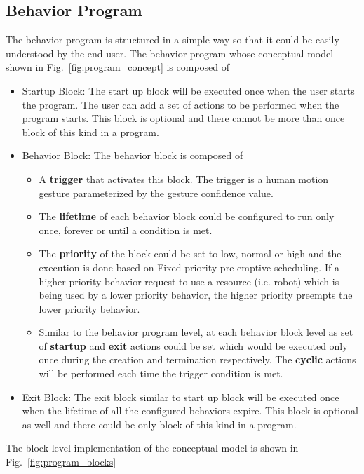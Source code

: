 \documentclass{llncs}
\begin{document}
\subsection{Behavior Program}
%
The behavior program is structured in a simple way so that it could be easily understood by the end user. The behavior program whose conceptual model shown in Fig.~\ref{fig:program_concept} is composed of
\begin{itemize}
\item Startup Block: The start up block will be executed once when the user starts the program. The user can add a set of actions to be performed when the program starts. This block is optional and there cannot be more than once block of this kind in a program.
\item Behavior Block: The behavior block is composed of
\begin{itemize}
\item A \textbf{trigger} that activates this block. The trigger is a human motion gesture parameterized by the gesture confidence value.
\item The \textbf{lifetime} of each behavior block could be configured to run only once, forever or until a condition is met. 
\item The \textbf{priority} of the block could be set to low, normal or high and the execution is done based on Fixed-priority pre-emptive scheduling. If a higher priority behavior request to use a resource (i.e. robot) which is being used by a lower priority behavior, the higher priority preempts the lower priority behavior.
\item Similar to the behavior program level, at each behavior block level as set of \textbf{startup} and \textbf{exit} actions could be set which would be executed only once during the creation and termination respectively. The \textbf{cyclic} actions will be performed each time the trigger condition is met.
\end{itemize}
\item Exit Block: The exit block similar to start up block will be executed once when the lifetime of all the configured behaviors expire. This block is optional as well and there could be only block of this kind in a program.
\end{itemize}
The block level implementation of the conceptual model is shown in Fig.~\ref{fig:program_blocks}
\end{document}
